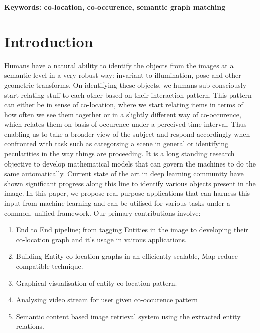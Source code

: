\documentclass[conference]{IEEEtran}
\begin{document}

\textbf{Keywords: co-location, co-occurence, semantic graph matching}

%
\IEEEpeerreviewmaketitle



\section{Introduction}
Humans have a natural ability to identify the objects from the images at a semantic level in a very robust way: invariant to illumination, pose and other geometric transforms. On identifying these objects, we humans sub-consciously start relating stuff to each other based on their interaction pattern. This pattern can either be in sense of co-location, where we start relating items in terms of how often we see them together or in a slightly different way of co-occurence, which relates them on basis of occurence under a perceived time interval. Thus enabling us to take a broader view of the subject and respond accordingly when confronted with task such as categorsing a scene in general or identifying pecularities in the way things are proceeding. It is  a long standing research objective to develop mathematical models that can govern the machines to do the same automatically. Current state of the art in deep learning community have shown significant progress along this line to identify various objects present in the image. In this paper, we propose real purpose applications that can harness this input from machine learning and can be utilised for various tasks under a common, unified framework. Our primary contributions involve:
    \begin{enumerate}
        \item End to End pipeline; from tagging Entities in the image to developing their co-location graph and it's usage in vairous applications.
        \item Building Entity co-location graphs in an efficiently scalable, Map-reduce compatible technique.
        \item Graphical visualisation of entity co-location pattern.
        \item Analysing video stream for user given co-occurence pattern
        \item Semantic content based image retrieval system using the extracted entity relations.
    \end{enumerate}
\end{document}
